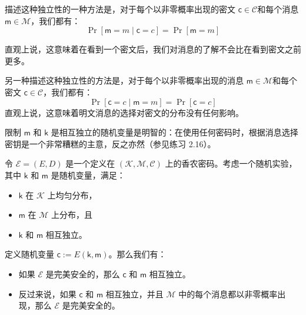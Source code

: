 描述这种独立性的一种方法是，对于每个以非零概率出现的密文 $\mathsf{c}\in\mathcal{C}$和每个消息 $\mathsf{m}\in\mathcal{M}$，我们都有：
$$
\Pr[\mathsf{m}=m\;|\;\mathsf{c}=c]=
\Pr[\mathsf{m}=m]
$$

直观上说，这意味着在看到一个密文后，我们对消息的了解不会比在看到密文之前更多。

另一种描述这种独立性的方法是，对于每个以非零概率出现的消息 $\mathsf{m}\in\mathcal{M}$和每个密文 $\mathsf{c}\in\mathcal{C}$，我们都有：
$$
\Pr[\mathsf{c}=c\;|\;\mathsf{m}=m]=
\Pr[\mathsf{c}=c]
$$
直观上说，这意味着明文消息的选择对密文的分布没有任何影响。

限制 $\mathsf{m}$ 和 $\mathsf{k}$ 是相互独立的随机变量是明智的：在使用任何密码时，根据消息选择密钥是一个非常糟糕的主意，反之亦然（参见练习 2.16）。

\begin{theorem}\label{theo:2-4}
令 $\mathcal{E}=(E,D)$ 是一个定义在 $(\mathcal{K},\mathcal{M},\mathcal{C})$ 上的香农密码。考虑一个随机实验，其中 $\mathsf{k}$ 和 $\mathsf{m}$ 是随机变量，满足：
\begin{itemize}
	\item $\mathsf{k}$ 在 $\mathcal{K}$ 上均匀分布，
	\item $\mathsf{m}$ 在 $\mathcal{M}$ 上分布，且
	\item $\mathsf{k}$ 和 $\mathsf{m}$ 相互独立。
\end{itemize}
定义随机变量 $\mathsf{c}:=E(\mathsf{k},\mathsf{m})$。那么我们有：
\begin{itemize}
	\item 如果 $\mathcal{E}$ 是完美安全的，那么 $\mathsf{c}$ 和 $\mathsf{m}$ 相互独立。
	\item 反过来说，如果 $\mathsf{c}$ 和 $\mathsf{m}$ 相互独立，并且 $\mathcal{M}$ 中的每个消息都以非零概率出现，那么 $\mathcal{E}$ 是完美安全的。
\end{itemize}
\end{theorem}

